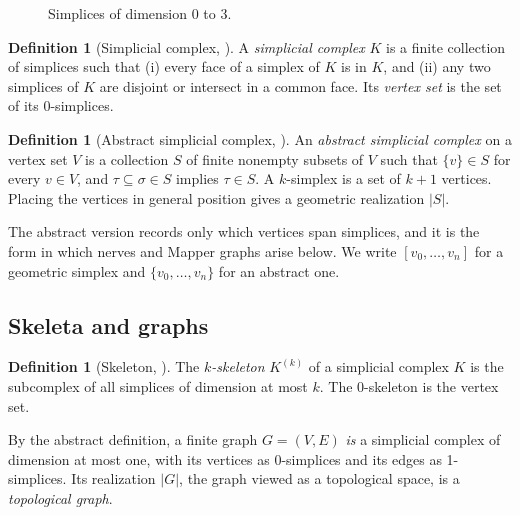 \documentclass{article}
\theoremstyle{definition}
\newtheorem{definition}[theorem]{Definition}
\theoremstyle{remark}
\begin{document}
\begin{figure}[htbp]
\centering
{}
\caption{Simplices of dimension 0 to 3.}\label{fig:simplices}
\end{figure}

\begin{definition}[Simplicial complex, {\cite{edelsbrunnerletscherzomorodian2002}}]
A \emph{simplicial complex} $K$ is a finite collection of simplices such that (i) every face of a simplex of $K$ is in $K$, and (ii) any two simplices of $K$ are disjoint or intersect in a common face.
Its \emph{vertex set} is the set of its 0-simplices.
\end{definition}

\begin{definition}[Abstract simplicial complex, {\cite{zomorodiancarlsson2005}}]
An \emph{abstract simplicial complex} on a vertex set $V$ is a collection $S$ of finite nonempty subsets of $V$ such that $\{v\} \in S$ for every $v \in V$, and $\tau \subseteq \sigma \in S$ implies $\tau \in S$.
A $k$-simplex is a set of $k+1$ vertices. Placing the vertices in general position gives a geometric realization $|S|$.
\end{definition}
The abstract version records only which vertices span simplices, and it is the form in which nerves and Mapper graphs arise below.
We write $[v_0, \dots, v_n]$ for a geometric simplex and $\{v_0, \dots, v_n\}$ for an abstract one.

\subsection{Skeleta and graphs}
\begin{definition}[Skeleton, {\cite{edelsbrunnerharerpatel2008}}]
The \emph{$k$-skeleton} $K^{(k)}$ of a simplicial complex $K$ is the subcomplex of all simplices of dimension at most $k$. The 0-skeleton is the vertex set.
\end{definition}
By the abstract definition, a finite graph $G = (V, E)$ \emph{is} a simplicial complex of dimension at most one, with its vertices as 0-simplices and its edges as 1-simplices.
Its realization $|G|$, the graph viewed as a topological space, is a \emph{topological graph}.
\end{document}
